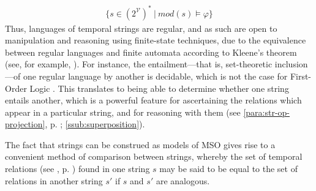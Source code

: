 \documentclass[a4paper,12pt,leqno]{article}
\newcommand{\V}{\mathcal{V}}
\renewcommand{\phi}{\varphi}
\newcommand{\nb}[1]{{\color{red}[NB\footnote{{\color{red}#1}}]}}
\begin{document}
\begin{align}\label{def:mso-regularity}
	\{s \in (2^{\V})^* ~|~ mod(s) \models \phi \}
\end{align}
Thus, languages of temporal strings are regular, and as such are open to manipulation and reasoning using finite-state techniques, due to the equivalence between regular languages and finite automata according to Kleene's theorem (see, for example, \citet[p. 41]{yu1997regular}). For instance, the entailment---that is, set-theoretic inclusion---of one regular language by another is decidable, which is not the case for First-Order Logic \citep{trakhtenbrot1953recursive,elgot1966decidability}. This translates to being able to determine whether one string entails another, which is a powerful feature for ascertaining the relations which appear in a particular string, and for reasoning with them (see \cref{para:str-op-projection}, p. \pageref{para:str-op-projection}; \cref{ssub:superposition}).

The fact that strings can be construed as models of MSO gives rise to a convenient method of comparison between strings, whereby the set of temporal relations (see , p. \pageref{tab:allen-rels-strings}) found in one string $s$ may be said to be equal to the set of relations in another string $s'$ if $s$ and $s'$ are analogous.
\end{document}
